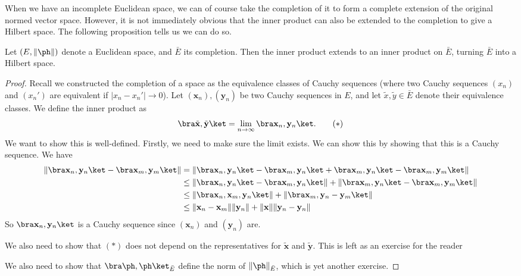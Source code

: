 \documentclass[a4paper]{article}
\begin{document}
When we have an incomplete Euclidean space, we can of course take the completion of it to form a complete extension of the original normed vector space. However, it is not immediately obvious that the inner product can also be extended to the completion to give a Hilbert space. The following proposition tells us we can do so.
\begin{prop}
  Let $(E, \|\ph\|)$ denote a Euclidean space, and $\bar{E}$ its completion. Then the inner product extends to an inner product on $\bar{E}$, turning $\bar{E}$ into a Hilbert space.
\end{prop}

\begin{proof}
  Recall we constructed the completion of a space as the equivalence classes of Cauchy sequences (where two Cauchy sequences $(x_n)$ and $(x_n')$ are equivalent if $|x_n - x_n'| \to 0$). Let $(\mathbf{x}_n), (\mathbf{y}_n)$ be two Cauchy sequences in $E$, and let $\tilde{x}, \tilde{y} \in \bar{E}$ denote their equivalence classes. We define the inner product as
  \[
    \bra \tilde{\mathbf{x}}, \tilde{\mathbf{y}}\ket = \lim_{n \to \infty} \bra \mathbf{x}_n,\mathbf{y}_n\ket.\tag{$*$}
  \]
  We want to show this is well-defined. Firstly, we need to make sure the limit exists. We can show this by showing that this is a Cauchy sequence. We have
  \begin{align*}
    \|\bra \mathbf{x}_n, \mathbf{y}_n\ket - \bra \mathbf{x}_m, \mathbf{y}_m \ket\| &= \|\bra \mathbf{x}_n, \mathbf{y}_n\ket - \bra \mathbf{x}_m, \mathbf{y}_n\ket + \bra \mathbf{x}_m, \mathbf{y}_n\ket - \bra \mathbf{x}_m, \mathbf{y}_m\ket\|\\
    &\leq \|\bra \mathbf{x}_n, \mathbf{y}_n\ket - \bra \mathbf{x}_m, \mathbf{y}_n\ket \| + \|\bra \mathbf{x}_m, \mathbf{y}_n\ket - \bra \mathbf{x}_m, \mathbf{y}_m\ket\|\\
    &\leq \|\bra \mathbf{x}_n, \mathbf{x}_m, \mathbf{y}_n\ket \| + \|\bra \mathbf{x}_m, \mathbf{y}_n - \mathbf{y}_m\ket\|\\
    &\leq \|\mathbf{x}_n - \mathbf{x}_m\| \|\mathbf{y}_n\| + \|\mathbf{x}\|\|\mathbf{y}_n - \mathbf{y}_n\|
  \end{align*}
  So $\bra \mathbf{x}_n, \mathbf{y}_n\ket$ is a Cauchy sequence since $(\mathbf{x}_n)$ and $(\mathbf{y}_n)$ are.

  We also need to show that $(*)$ does not depend on the representatives for $\tilde{\mathbf{x}}$ and $\tilde{\mathbf{y}}$. This is left as an exercise for the reader %

  We also need to show that $\bra \ph, \ph\ket_{\bar{E}}$ define the norm of $\|\ph \|_{\bar{E}}$, which is yet another exercise. %
\end{proof}
\end{document}
